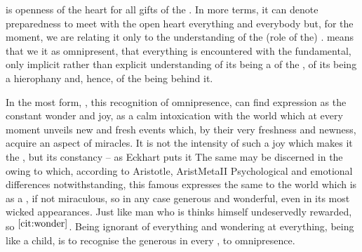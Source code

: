 \pa {} is openness of the heart for all gifts of the
. In more  terms, it can denote preparedness to meet
with the open heart everything and everybody but, for the moment, we are relating
it only to the understanding of the (role of the) .  means that we
 it as omnipresent, that everything is encountered with the
fundamental, only implicit rather than explicit understanding of its being a
 of the 
, of its being a hierophany and, hence, of the  being
 behind it. 

In the most  form, , this recognition of
omnipresence, can find expression as the constant wonder and joy, as a calm
intoxication with the world which at every moment unveils new and fresh events
which, by their very freshness and newness, acquire an aspect of 
miracles. It is not the intensity of such a joy which makes it the
, but its constancy -- 
as Eckhart puts it 
The same  may be discerned in the  owing to which,
according to Aristotle, \citet{men both now begin and at first began to
  philosophize.}{AristMeta}{II\label{cit:wonder}} Psychological and emotional
differences notwithstanding, this famous  expresses
the same  to the world which is  as a , if
not miraculous, so in any case generous and wonderful, even in its most wicked
appearances. Just like man who is  thinks himself
undeservedly rewarded, so $^{\ref{cit:wonder}}$. Being ignorant of everything and
wondering at everything, being like a child, is to recognise the generous
 in every , to  omnipresence.

